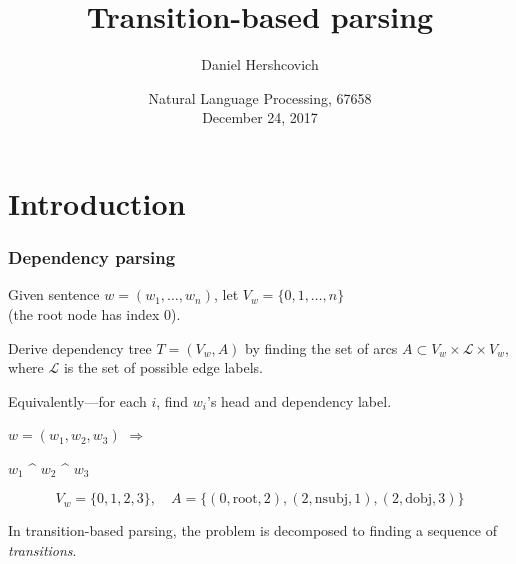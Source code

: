 \documentclass[t]{beamer}
\title{Transition-based parsing}
\author{Daniel Hershcovich}
\date{Natural Language Processing, 67658 \\ December 24, 2017}
\begin{document}
\frame{\titlepage}




\section{Introduction}

\begin{frame}
  \frametitle{Dependency parsing}
  Given sentence $w=(w_1, \ldots, w_n)$,
  let $V_w=\{0, 1, \ldots, n \}$ \\
  (the root node has index 0).
  
  Derive dependency tree $T=(V_w,A)$ by finding the set of arcs
  $A \subset V_w \times \mathcal{L} \times V_w$,
  where $\mathcal{L}$ is the set of possible edge labels.
  
  \vfill

  Equivalently---for each $i$, find $w_i$'s head and dependency label.
  
  \pause
  
  \begin{center}
	  \begin{minipage}{4cm}
	    $w=(w_1, w_2, w_3)$ \hfill $\Rightarrow$
	  \end{minipage}
	  \begin{minipage}{5cm}
	    \begin{dependency}
	      \begin{deptext}[column sep=1.5em,ampersand replacement=\^,font=\rmfamily]
	        $w_1$ \^ $w_2$ \^ $w_3$ \\
	      \end{deptext}
	    \end{dependency}
	  \end{minipage}
  \end{center}
  \[
      V_w=\{0,1,2,3\}, \quad
      A=\{(0,\mathrm{root},2),(2,\mathrm{nsubj},1),(2,\mathrm{dobj},3)\}
  \]
  
  \pause

  In transition-based parsing,
  the problem is decomposed to finding a sequence of \textit{transitions}.
\end{frame}
\end{document}
